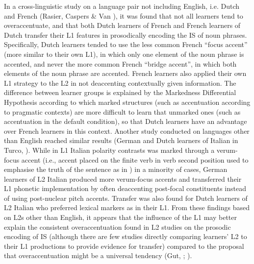In a cross-linguistic study on a language pair not including English, i.e. Dutch and French (Rasier, Caspers \& Van \citealt{Heuven2010}), it was found that not all learners tend to overaccentuate, and that both Dutch learners of French and French learners of Dutch transfer their L1 features in prosodically encoding the IS of noun phrases. Specifically, Dutch learners tended to use the less common French “focus accent” (more similar to their own L1), in which only one element of the noun phrase is accented, and never the more common French “bridge accent”, in which both elements of the noun phrase are accented. French learners also applied their own L1 strategy to the L2 in not deaccenting contextually given information. The difference between learner groups is explained by the Markedness Differential Hypothesis \citep{Eckman1977} according to which marked structures (such as accentuation according to pragmatic contexts) are more difficult to learn that unmarked ones (such as accentuation in the default condition), so that Dutch learners have an advantage over French learners in this context. Another study conducted on languages other than English reached similar results (German and Dutch learners of Italian in Turco, \citealt{DimrothBraun2015}). While in L1 Italian polarity contrasts was marked through a verum-focus accent (i.e., accent placed on the finite verb in verb second position used to emphasise the truth of the sentence as in \citealt{Höhle1992}) in a minority of cases, German learners of L2 Italian produced more verum-focus accents and transferred their L1 phonetic implementation by often deaccenting post-focal constituents instead of using post-nuclear pitch accents. Transfer was also found for Dutch learners of L2 Italian who preferred lexical markers as in their L1. From these findings based on L2s other than English, it appears that the influence of the L1 may better explain the consistent overaccentuation found in L2 studies on the prosodic encoding of IS (although there are few studies directly comparing learners’ L2 to their L1 productions to provide evidence for transfer) compared to the proposal that overaccentuation might be a universal tendency (Gut, \citealt{PillaiDon2013}; \citealt{GutPillai2014}).


